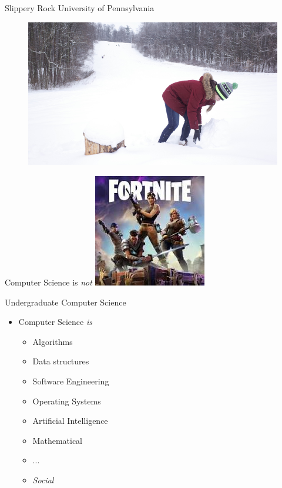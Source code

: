 \documentclass{beamer}
\begin{document}
\begin{frame}{Slippery Rock University of Pennsylvania}
\begin{figure}
	\includegraphics[width=\linewidth]{img/sru3.jpg}
\end{figure}
\end{frame}

\begin{frame}{Computer Science is \emph{not}} 
\centering \includegraphics[width=.5\linewidth]{img/fortnite.jpg}
\end{frame}

\begin{frame}{Undergraduate Computer Science}
\begin{itemize}
	\item Computer Science \emph{is}
	\begin{itemize}
		\item Algorithms
		\item Data structures
		\item Software Engineering
		\item Operating Systems
		\item Artificial Intelligence
		\item Mathematical
		\item ...
		\item \emph{Social}
	\end{itemize}
\end{itemize}
\end{frame}
\end{document}
